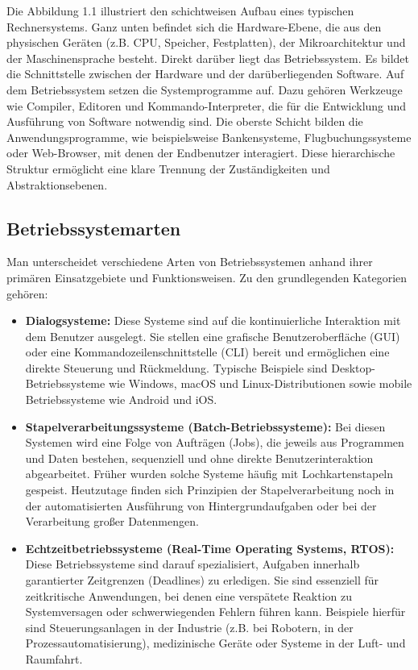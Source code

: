 Die Abbildung 1.1 illustriert den schichtweisen Aufbau eines typischen Rechnersystems. Ganz unten befindet sich die Hardware-Ebene, die aus den physischen Geräten (z.B. CPU, Speicher, Festplatten), der Mikroarchitektur und der Maschinensprache besteht. Direkt darüber liegt das Betriebssystem. Es bildet die Schnittstelle zwischen der Hardware und der darüberliegenden Software. Auf dem Betriebssystem setzen die Systemprogramme auf. Dazu gehören Werkzeuge wie Compiler, Editoren und Kommando-Interpreter, die für die Entwicklung und Ausführung von Software notwendig sind. Die oberste Schicht bilden die Anwendungsprogramme, wie beispielsweise Bankensysteme, Flugbuchungssysteme oder Web-Browser, mit denen der Endbenutzer interagiert. Diese hierarchische Struktur ermöglicht eine klare Trennung der Zuständigkeiten und Abstraktionsebenen.

\subsection{Betriebssystemarten}

Man unterscheidet verschiedene Arten von Betriebssystemen anhand ihrer primären Einsatzgebiete und Funktionsweisen. Zu den grundlegenden Kategorien gehören:

\begin{itemize}
\item \textbf{Dialogsysteme:} Diese Systeme sind auf die kontinuierliche Interaktion mit dem Benutzer ausgelegt. Sie stellen eine grafische Benutzeroberfläche (GUI) oder eine Kommandozeilenschnittstelle (CLI) bereit und ermöglichen eine direkte Steuerung und Rückmeldung. Typische Beispiele sind Desktop-Betriebssysteme wie Windows, macOS und Linux-Distributionen sowie mobile Betriebssysteme wie Android und iOS.
\item \textbf{Stapelverarbeitungssysteme (Batch-Betriebssysteme):} Bei diesen Systemen wird eine Folge von Aufträgen (Jobs), die jeweils aus Programmen und Daten bestehen, sequenziell und ohne direkte Benutzerinteraktion abgearbeitet. Früher wurden solche Systeme häufig mit Lochkartenstapeln gespeist. Heutzutage finden sich Prinzipien der Stapelverarbeitung noch in der automatisierten Ausführung von Hintergrundaufgaben oder bei der Verarbeitung großer Datenmengen.
\item \textbf{Echtzeitbetriebssysteme (Real-Time Operating Systems, RTOS):} Diese Betriebssysteme sind darauf spezialisiert, Aufgaben innerhalb garantierter Zeitgrenzen (Deadlines) zu erledigen. Sie sind essenziell für zeitkritische Anwendungen, bei denen eine verspätete Reaktion zu Systemversagen oder schwerwiegenden Fehlern führen kann. Beispiele hierfür sind Steuerungsanlagen in der Industrie (z.B. bei Robotern, in der Prozessautomatisierung), medizinische Geräte oder Systeme in der Luft- und Raumfahrt.
\end{itemize}


